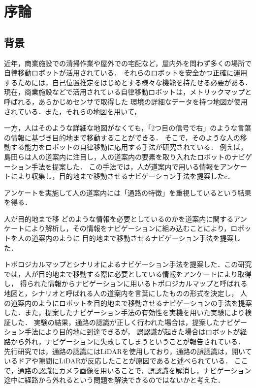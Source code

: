 \documentclass[../main]{subfiles}
\begin{document}
    \setcounter{secnumdepth}{2}
    \chapter{序論}
        \section{背景}
        近年，商業施設での清掃作業や屋外での宅配など，屋内外を問わず多くの場所で自律移動ロボットが活用されている．
        それらのロボットを安全かつ正確に運用するためには，自己位置推定をはじめとする様々な機能を持たせる必要がある．
        現在，商業施設などで活用されている自律移動ロボットは，メトリックマップと呼ばれる，あらかじめセンサで取得した
        環境の詳細なデータを持つ地図が使用されている．また，それらの地図を用いて，
        
        
        一方，人はそのような詳細な地図がなくても，「2つ目の信号で右」のような言葉の情報に基づき目的地まで移動することができる．
        そこで，そのような人の移動する能力をロボットの自律移動に応用する手法が研究されている．
        例えば，島田らは人の道案内に注目し，人の道案内の要素を取り入れたロボットのナビゲーション手法を提案した\cite{shimada_paper1}\cite{shimada_paper2}．
        この手法では，人が道案内で用いる情報をアンケートにより収集し，目的地まで移動させるナビゲーション手法を提案したc．
        
        アンケートを実施して人の道案内には「通路の特徴」を重視しているという結果を得る．
        

        人が目的地まで移
        どのような情報を必要としているのかを道案内に関するアンケートにより解析し，その情報をナビゲーションに組み込むことにより，ロボットを人の道案内のように
        目的地まで移動させるナビゲーション手法を提案した\cite{shimada_paper1}\cite{shimada_paper2}．
        
        トポロジカルマップとシナリオによるナビゲーション手法を提案した．この研究では，人が目的地まで移動する際に必要としている情報をアンケートにより取得し，
        得られた情報からナビゲーションに用いるトポロジカルマップと呼ばれる地図と，シナリオと呼ばれる人の道案内を言葉にしたものの形式を決定し，
        人の道案内のようにロボットを目的地まで移動させるナビゲーションの手法を提案した．また，提案したナビゲーション手法の有効性を実機を用いた実験により検証した．
        実験の結果，通路の認識が正しく行われた場合は，提案したナビゲーション手法により目的地に到達できるが，
        誤認識が起きた場合はロボットが経路から外れ，ナビゲーションに失敗してしまうということが報告されている．
        先行研究では，通路の認識にはLiDARを使用しており，通路の誤認識は，開いているドアや隙間にLiDARが反応したことが原因であると述べられている．
        ここで，通路の認識にカメラ画像を用いることで，誤認識を解消し，ナビゲーション途中に経路から外れるという問題を解決できるのではないかと考えた．
\end{document}
